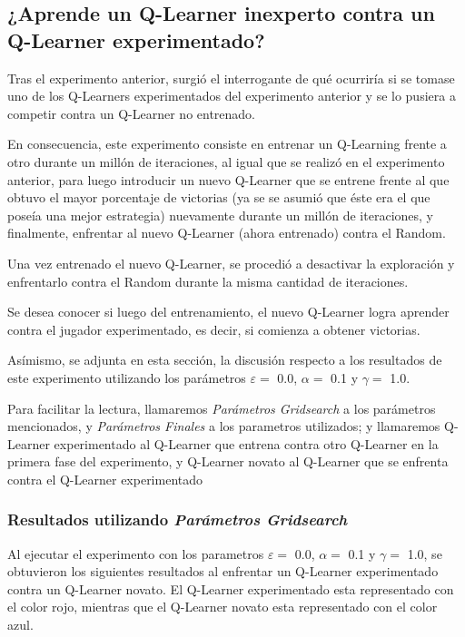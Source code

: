 \subsection{¿Aprende un Q-Learner inexperto contra un Q-Learner experimentado?}

Tras el experimento anterior, surgió el interrogante de qué ocurriría si se tomase uno de los Q-Learners experimentados del experimento anterior y se lo pusiera a competir contra un Q-Learner no entrenado.

En consecuencia, este experimento consiste en entrenar un Q-Learning frente a otro durante un mill\'on de iteraciones, al igual que se realizó en el experimento anterior, para luego introducir un nuevo Q-Learner que se entrene frente al que obtuvo el mayor porcentaje de victorias (ya se se asumió que éste era el que poseía una mejor estrategia) nuevamente durante un mill\'on de iteraciones, y finalmente, enfrentar al nuevo Q-Learner (ahora entrenado) contra el Random.

Una vez entrenado el nuevo Q-Learner, se procedió a desactivar la exploración y enfrentarlo contra el Random durante la misma cantidad de iteraciones.

Se desea conocer si luego del entrenamiento, el nuevo Q-Learner logra aprender contra el jugador experimentado, es decir, si comienza a obtener victorias.

Asímismo, se adjunta en esta sección, la discusión respecto a los resultados de este experimento utilizando los parámetros $\varepsilon = $ 0.0, $\alpha = $ 0.1 y $\gamma = $ 1.0.

Para facilitar la lectura, llamaremos \emph{Parámetros Gridsearch} a los parámetros mencionados, y \emph{Parámetros Finales} a los parametros utilizados; y llamaremos Q-Learner experimentado al Q-Learner que entrena contra otro Q-Learner en la primera fase del experimento, y Q-Learner novato al Q-Learner que se enfrenta contra el Q-Learner experimentado

\subsubsection{Resultados utilizando \emph{Parámetros Gridsearch}} %

Al ejecutar el experimento con los parametros $\varepsilon = $ 0.0, $\alpha = $ 0.1 y $\gamma = $ 1.0, se obtuvieron los siguientes resultados al enfrentar un Q-Learner experimentado contra un Q-Learner novato. El Q-Learner experimentado esta representado con el color rojo, mientras que el Q-Learner novato esta representado con el color azul.

